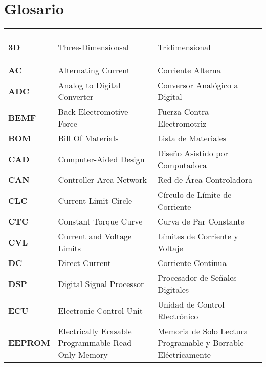 \chapter*{Glosario}

\begin{longtable}{>{\bfseries}p{3cm} p{5cm} p{5cm}}
	\endfirsthead
	\multicolumn{3}{c}{ } \\
	\endfoot
	\endlastfoot

\textbf{3D} & Three-Dimensionsal & Tridimensional \\

\textbf{AC} & Alternating Current & Corriente Alterna \\

\textbf{ADC} & Analog to Digital Converter & Conversor Analógico a Digital \\

\textbf{BEMF} & Back Electromotive Force & Fuerza Contra-Electromotriz \\

\textbf{BOM} & Bill Of Materials & Lista de Materiales \\

\textbf{CAD} & Computer-Aided Design & Diseño Asistido por Computadora \\

\textbf{CAN} & Controller Area Network & Red de Área Controladora \\

\textbf{CLC} & Current Limit Circle & Círculo de Límite de Corriente \\

\textbf{CTC} & Constant Torque Curve & Curva de Par Constante \\

\textbf{CVL} & Current and Voltage Limits & Límites de Corriente y Voltaje \\

\textbf{DC} & Direct Current & Corriente Continua \\

\textbf{DSP} & Digital Signal Processor & Procesador de Señales Digitales \\

\textbf{ECU} & Electronic Control Unit & Unidad de Control Rlectrónico \\

\textbf{EEPROM} & Electrically Erasable Programmable Read-Only Memory & Memoria de Solo Lectura Programable y Borrable Eléctricamente \\


\end{longtable}
